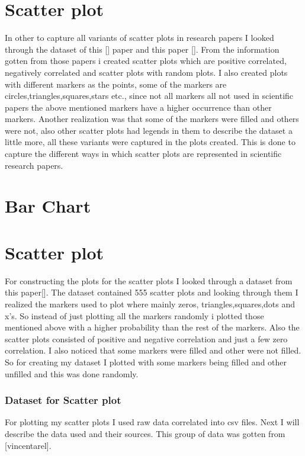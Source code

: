 \documentclass[12pt, a4paper,oneside]{report}
\begin{document}
\chapter{Scatter plot}
In other to capture all variants of scatter plots in research papers I looked through the dataset of this [] paper and this paper []. From the information gotten from those papers i created scatter plots which are positive correlated, negatively correlated and scatter plots with random plots. I also created plots with different markers as the points, some of the markers are circles,triangles,squares,stars etc., since not all markers all not used in scientific papers the above mentioned markers have a higher occurrence than other markers. Another realization was that some of the markers were filled and others were not, also other scatter plots had legends in them to describe the dataset a little more, all these variants were captured in the plots created. This is done to capture the different ways in which scatter plots are represented in scientific research papers.


\chapter{Bar Chart}





\chapter{Scatter plot}
For constructing the plots for the scatter plots I looked through a dataset from this paper[]. The dataset contained 555
scatter plots and looking through them I realized the markers used to plot where mainly zeros, triangles,squares,dots and x's.
So instead of just plotting all the markers randomly i plotted those mentioned above with a higher probability than the rest of the markers.
Also the scatter plots consisted of positive and negative correlation and just a few zero correlation. 
I also noticed that some markers were filled and other were not filled. So for creating my dataset I plotted with some markers being filled and other unfilled and this was done randomly. 

\subsection{Dataset for Scatter plot}
For plotting my scatter plots I used raw data correlated into csv files. Next I will describe the data used and their sources.
This group of data was gotten from [vincentarel].
\end{document}
